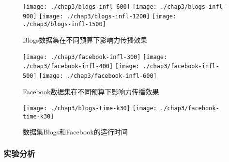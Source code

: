 \begin{figure}[H]
	\centering%
	{\texttt{[image: ./chap3/blogs-infl-600]}}
	\hspace{3em}%
	{\texttt{[image: ./chap3/blogs-infl-900]}}
	\hspace{3em}%
	{\texttt{[image: ./chap3/blogs-infl-1200]}}
	\hspace{3em}%
	{\texttt{[image: ./chap3/blogs-infl-1500]}}
	\caption{Blogs数据集在不同预算下影响力传播效果}
	\label{fig:chap3:blogs-infl}
\end{figure}


\begin{figure}[H]
	\centering%
	{\texttt{[image: ./chap3/facebook-infl-300]}}
	\hspace{3em}%
	{\texttt{[image: ./chap3/facebook-infl-400]}}
	\hspace{3em}%
	{\texttt{[image: ./chap3/facebook-infl-500]}}
	\hspace{3em}%
	{\texttt{[image: ./chap3/facebook-infl-600]}}
	\caption{Facebook数据集在不同预算下影响力传播效果}
	\label{fig:chap3:facebook-infl}
\end{figure}


\begin{figure}[H]
	\centering%
	{\texttt{[image: ./chap3/blogs-time-k30]}}
	\hspace{3em}%
	{\texttt{[image: ./chap3/facebook-time-k30]}}
	\caption{数据集Blogs和Facebook的运行时间}
	\label{fig:chap3:running-time}
\end{figure}

\subsubsection{实验分析}


